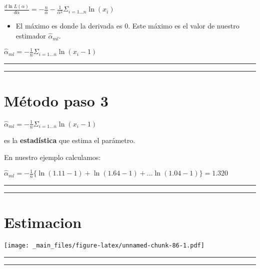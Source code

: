 \documentclass[
]{book}
\providecommand{\tightlist}{%
  \setlength{\itemsep}{0pt}\setlength{\parskip}{0pt}}
\begin{document}
\(\frac{d \ln L(\alpha)}{d \alpha}= -\frac{n}{\alpha} - \frac{1}{\alpha^2} \Sigma_{i=1... n} \ln (x_i)\)

\begin{itemize}
\tightlist
\item
  El máximo es donde la derivada es \(0\). Este máximo es el valor de nuestro estimador \(\hat{\alpha}_{ml}\).
\end{itemize}

\(\hat{\alpha}_{ml}=-\frac{1}{n}\Sigma_{i=1...n} \ln (x_i-1)\)

\begin{center}\rule{0.5\linewidth}{0.5pt}\end{center}

\begin{center}\rule{0.5\linewidth}{0.5pt}\end{center}

\hypertarget{muxe9todo-paso-3-1}{%
\section{Método paso 3}\label{muxe9todo-paso-3-1}}

\(\hat{\alpha}_{ml}=-\frac{1}{n}\Sigma_{i=1...n} \ln (x_i-1)\)

es la \textbf{estadística} que estima el parámetro.

En nuestro ejemplo calculamos:

\(\hat{\alpha}_{ml}=-\frac{1}{n}\{ \ln (1.11-1)+ \ln (1.64-1)+...\ln (1.04-1)\}=1.320\)

\begin{center}\rule{0.5\linewidth}{0.5pt}\end{center}

\begin{center}\rule{0.5\linewidth}{0.5pt}\end{center}

\hypertarget{estimacion}{%
\section{Estimacion}\label{estimacion}}

\texttt{[image: \_main\_files/figure-latex/unnamed-chunk-86-1.pdf]}

\begin{center}\rule{0.5\linewidth}{0.5pt}\end{center}

\begin{center}\rule{0.5\linewidth}{0.5pt}\end{center}
\end{document}
